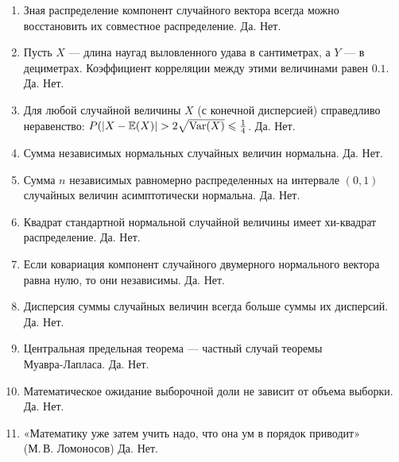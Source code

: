 \documentclass[12pt, a4paper]{article}\usepackage[]{graphicx}\usepackage[]{color}
\begin{document}
\begin{enumerate}
\item{Зная распределение компонент случайного вектора всегда можно восстановить их совместное распределение. Да. Нет.}

\item{Пусть $X$ — длина наугад выловленного удава в сантиметрах, а $Y$ — в дециметрах. Коэффициент корреляции между этими величинами равен $0.1$. Да. Нет.}

\item{Для любой случайной величины $X$ (с конечной дисперсией) справедливо неравенство: $P(|X-\E(X)|>2\sqrt{\Var(X)}\leqslant \frac{1}{4}$. Да. Нет.}

\item{Сумма независимых нормальных случайных величин нормальна. Да. Нет.}

\item{Сумма $n$ независимых равномерно распределенных на интервале $(0,1)$ случайных величин асимптотически нормальна. Да. Нет.}

\item{Квадрат стандартной нормальной случайной величины имеет хи-квадрат распределение. Да. Нет.}

\item{Если ковариация компонент случайного двумерного нормального вектора равна нулю, то они независимы. Да. Нет.}

\item{Дисперсия суммы случайных величин всегда больше суммы их дисперсий. Да. Нет.}

\item{Центральная предельная теорема –-- частный случай теоремы \\Муавра-Лапласа. Да. Нет.}

\item{Математическое ожидание выборочной доли не зависит от объема выборки. Да. Нет.}

\item{«Математику уже затем учить надо, что она ум в порядок приводит» \\ (М.\,В. Ломоносов) Да. Нет.}

\end{enumerate}
\end{document}
